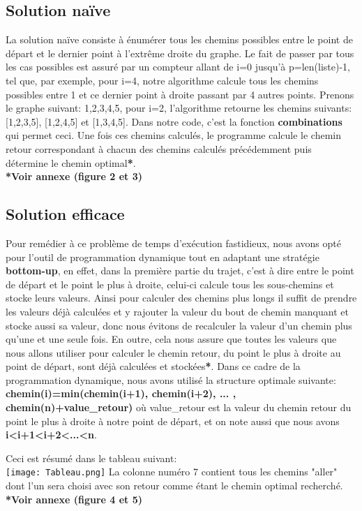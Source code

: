 \documentclass[12pt, openany]{report}
\begin{document}
\setlength{\parindent}{1cm}\subsection{Solution naïve}
La solution naïve consiste à énumérer tous les chemins possibles entre le point de départ et le dernier point à l'extrême droite du graphe. Le fait de passer par tous les cas possibles est assuré par un compteur allant de i=0 jusqu'à p=len(liste)-1, tel que, par exemple, pour i=4, notre algorithme calcule tous les chemins possibles entre 1 et ce dernier point à droite passant par 4 autres points. Prenons le graphe suivant:
{1,2,3,4,5}, pour i=2, l'algorithme retourne les chemins suivants: [1,2,3,5], [1,2,4,5] et [1,3,4,5]. Dans notre code, c'est la fonction \textbf{combinations} qui permet ceci.
Une fois ces chemins calculés, le programme calcule le chemin retour correspondant à chacun des chemins calculés précédemment puis détermine le chemin optimal\textbf{*}. \\
\textbf{*Voir annexe (figure 2 et 3)}
\setlength{\parindent}{1cm}\subsection{Solution efficace}
Pour remédier à ce problème de temps d'exécution fastidieux, nous avons opté pour l'outil de programmation dynamique tout en adaptant une stratégie \textbf{bottom-up}, en effet, dans la première partie du trajet, c'est à dire entre le point de départ et le point le plus à droite, celui-ci calcule tous les sous-chemins et stocke leurs valeurs. Ainsi pour calculer des chemins plus longs il suffit de prendre les valeurs déjà calculées et y rajouter la valeur du bout de chemin manquant et stocke aussi sa valeur, donc nous évitons de recalculer la valeur d'un chemin plus qu'une et une seule fois. En outre, cela nous assure que toutes les valeurs que nous allons utiliser pour calculer le chemin retour, du point le plus à droite au point de départ, sont déjà calculées et stockées\textbf{*}.
Dans ce cadre de la programmation dynamique, nous avons utilisé la structure optimale suivante: \textbf{chemin(i)=min(chemin(i+1), chemin(i+2), ... , chemin(n)+value\_retour)} où value\_retour est la valeur du chemin retour du point le plus à droite à notre point de départ, et on note aussi que nous avons \textbf{i<i+1<i+2<...<n}.\begin{center}
	
\end{center} 
Ceci est résumé dans le tableau suivant: \\
\texttt{[image: Tableau.png]} 
La colonne numéro 7 contient tous les chemins "aller" dont l'un sera choisi avec son retour comme étant le chemin optimal recherché. \\
\textbf{*Voir annexe (figure 4 et 5)}
\end{document}
